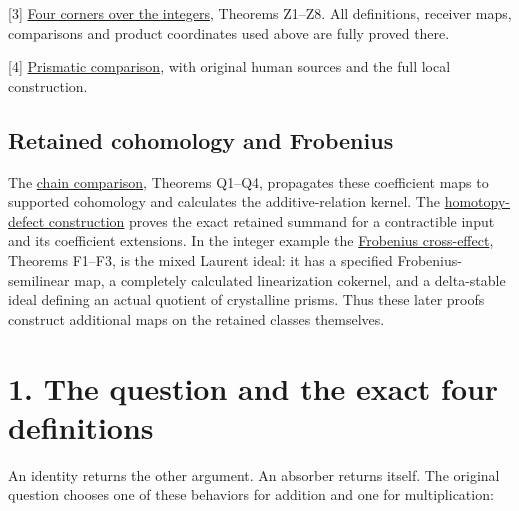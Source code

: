 \documentclass[
]{article}
\begin{document}
{[}3{]}
\href{https://github.com/KokunoYumeto/zeta-function-research-reader/blob/6af54ea3c8ef99127af327f3103e086c68d482c2/workbenches/splitzero-tandem/branches/identity-absorber-square/FOUR_CORNERS_OVER_Z.md}{Four
corners over the integers}, Theorems Z1--Z8. All definitions, receiver
maps, comparisons and product coordinates used above are fully proved
there.

{[}4{]}
\href{https://github.com/KokunoYumeto/zeta-function-research-reader/blob/6af54ea3c8ef99127af327f3103e086c68d482c2/workbenches/splitzero-tandem/branches/identity-absorber-square/PRISMATIC_COMPARISON.md}{Prismatic
comparison}, with original human sources and the full local
construction.

\subsection{Retained cohomology and
Frobenius}\label{retained-cohomology-and-frobenius}

The
\href{https://github.com/KokunoYumeto/zeta-function-research-reader/blob/6af54ea3c8ef99127af327f3103e086c68d482c2/workbenches/splitzero-tandem/branches/identity-absorber-square/CHAIN_COMPARISON.md}{chain
comparison}, Theorems Q1--Q4, propagates these coefficient maps to
supported cohomology and calculates the additive-relation kernel. The
\href{https://github.com/KokunoYumeto/zeta-function-research-reader/blob/6af54ea3c8ef99127af327f3103e086c68d482c2/workbenches/splitzero-tandem/branches/identity-absorber-square/HOMOTOPY_DEFECT.md}{homotopy-defect
construction} proves the exact retained summand for a contractible input
and its coefficient extensions. In the integer example the
\href{https://github.com/KokunoYumeto/zeta-function-research-reader/blob/6af54ea3c8ef99127af327f3103e086c68d482c2/workbenches/splitzero-tandem/branches/identity-absorber-square/FROBENIUS_CROSS_EFFECT.md}{Frobenius
cross-effect}, Theorems F1--F3, is the mixed Laurent ideal: it has a
specified Frobenius-semilinear map, a completely calculated
linearization cokernel, and a delta-stable ideal defining an actual
quotient of crystalline prisms. Thus these later proofs construct
additional maps on the retained classes themselves.

\section{1. The question and the exact four
definitions}\label{the-question-and-the-exact-four-definitions}

An identity returns the other argument. An absorber returns itself. The
original question chooses one of these behaviors for addition and one
for multiplication:
\end{document}

